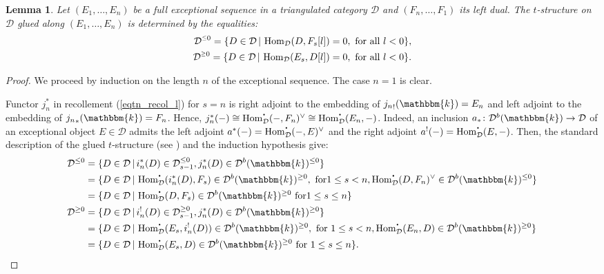\documentclass[12pt,a4paper]{amsart}
\newcommand{\dD}{{\mathcal{D}}}
\newcommand{\kk}{\mathbbm{k}}
\newcommand{\lle}{\mbox{\raisebox{0.25ex}{${\scriptscriptstyle\le}$}}}
\newcommand{\gge}{\mbox{\raisebox{0.25ex}{${\scriptscriptstyle\ge}$}}}
\newcommand{\tr}{{\mbox{$t$-struc}\-tu\-r}}
\newcommand{\bcdot}{{\mbox{\boldmath{$\cdot$}}}}
\newcommand{\Hom}{\mathop{\textrm{Hom}}\nolimits}
\newtheorem{LEM}{Lemma}[section]
\theoremstyle{definition}
\begin{document}
\begin{LEM}\label{lem_glued_t-str}
	Let $(E_1, \ldots, E_n ) $ be a full exceptional sequence in a triangulated category $\dD$ and $( F_n, \ldots, F_1 )$ its left dual. The \tr e on $\dD$ glued along $(E_1, \ldots, E_n ) $
	is determined by the equalities:
	\begin{align*}
	\dD^{\lle 0} = \{D\in \dD\,|\, \Hom_{\dD}(D, F_s[l])=0, \textrm{ for all } l<0
	\},\\
	\dD^{\gge 0} = \{D\in \dD\,|\, \Hom_{\dD}(E_s, D[l])=0, \textrm{ for all } l<0
	\}.
	\end{align*}
\end{LEM}
\begin{proof}
	We proceed by induction on the length $n$ of the exceptional sequence. The case $n=1$ is clear.
	
	Functor $j_n^*$ in recollement (\ref{eqtn_recol_l}) for $s=n$ is right adjoint to the embedding of ${j_n}_!(\kk) = E_n$ and left adjoint to the embedding of ${j_n}_*(\kk) = F_n$. Hence, $j_n^*(-) \cong \Hom^\bcdot_{\dD}(-,F_n)^\vee \cong \Hom^\bcdot_{\dD}(E_n,-)$. Indeed, an inclusion $a_*\colon \dD^b(\kk) \to \dD$ of an exceptional object $E\in \dD$ admits the left adjoint $a^*(-) = \Hom^\bcdot_{\dD}(-,E)^\vee$ and the right adjoint $a^!(-) = \Hom^\bcdot_{\dD}(E,-)$. Then, the standard description of the glued \tr e (see \cite[Theorem 1.4.10]{BBD}) and the induction hypothesis give:
	\begin{align*}
	\dD^{\leq 0} &= \{D\in \dD\,|\, i_n^*(D)\in \dD_{s-1}^{\leq 0}, j_n^*(D) \in \dD^b(\kk)^{\leq 0} \} \\
	&= \{D\in \dD\,|\, \Hom_{\dD}^{\bcdot}(i_n^*(D),F_s)\in \dD^b(\kk)^{\geq 0}, \textrm{ for} 1\leq s<n, \Hom^\bcdot_{\dD}(D, F_n)^\vee  \in \dD^b(\kk)^{\leq 0} \} \\
	&= \{D\in \dD\,|\, \Hom_{\dD}^{\bcdot}(D, F_s)\in \dD^b(\kk)^{\geq 0} \textrm{ for}1\leq s\leq n\}\\
	\dD^{\geq 0} &= \{D\in \dD\,|\, i_n^!(D)\in\dD_{s-1}^{\geq 0}, j_n^*(D) \in \dD^b(\kk)^{\geq 0} \}\\
	&= \{D\in \dD\,|\, \Hom_{\dD}^{\bcdot}(E_s,i_n^!(D))\in \dD^b(\kk)^{\geq 0}, \textrm{ for } 1\leq s<n, \Hom^\bcdot_{\dD}(E_n,D)\in \dD^b(\kk)^{\geq 0} \}\\
	& = \{D\in \dD \,|\, \Hom_{\dD}^{\bcdot}(E_s, D)\in \dD^b(\kk)^{\geq 0} \textrm{ for }1\leq s\leq n\}.\qedhere
	\end{align*}
\end{proof}
\end{document}
